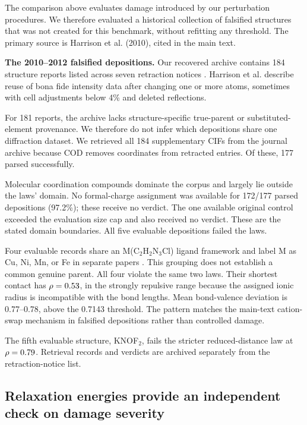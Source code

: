 The comparison above evaluates damage introduced by our perturbation procedures. We therefore evaluated a
historical collection of falsified structures that was not created for this benchmark,
without refitting any threshold. The primary source is Harrison et al. (2010), cited in
the main text.

\textbf{The 2010--2012 falsified depositions.} Our recovered archive contains
184 structure reports listed across seven retraction notices
\cite{iucr2010retractionzhong,iucr2010retractionliu,iucr2010retractionapril,
iucr2011retractionmarch,iucr2011retractionoctober,iucr2012retraction,iucr2012retractionjuly}.
Harrison et al. describe reuse of bona fide intensity data after changing one or
more atoms, sometimes with cell adjustments below 4\% and deleted reflections.

For 181 reports, the archive lacks structure-specific true-parent or
substituted-element provenance. We therefore do not infer which depositions share
one diffraction dataset. We retrieved all 184 supplementary CIFs from the
journal archive because COD removes coordinates from retracted entries. Of
these, 177 parsed successfully.

Molecular coordination compounds dominate the corpus and largely lie outside the
laws' domain. No formal-charge assignment was available for 172/177 parsed
depositions (97.2\%); these receive no verdict. The one available original
control exceeded the evaluation size cap and also received no verdict. These are
the stated domain boundaries. All five evaluable depositions failed the laws.

Four evaluable records share an M(C$_2$H$_2$N$_3$Cl) ligand framework and label
M as Cu, Ni, Mn, or Fe in separate papers \cite{iucr2012retraction}. This grouping
does not establish a common genuine parent. All four violate the same two laws.
Their shortest contact has $\rho=0.53$, in the strongly repulsive range because
the assigned ionic radius is incompatible with the bond lengths. Mean
bond-valence deviation is 0.77--0.78, above the 0.7143
threshold. The pattern matches
the main-text cation-swap mechanism in falsified depositions rather than
controlled damage.

The fifth evaluable structure, KNOF$_2$, fails the stricter reduced-distance
law at $\rho=0.79$. Retrieval records and verdicts are archived separately
from the retraction-notice list.

\subsection{Relaxation energies provide an independent check on damage severity}

